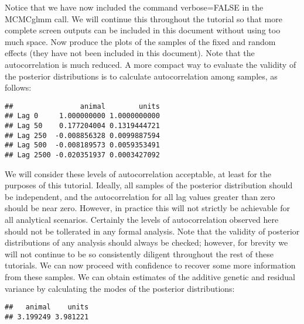 \documentclass[12pt,]{book}
\newenvironment{Shaded}{\begin{snugshade}}{\end{snugshade}}
\newcommand{\FloatTok}[1]{\textcolor[rgb]{0.00,0.00,0.81}{#1}}
\newcommand{\KeywordTok}[1]{\textcolor[rgb]{0.13,0.29,0.53}{\textbf{#1}}}
\newcommand{\NormalTok}[1]{#1}
\newcommand{\OperatorTok}[1]{\textcolor[rgb]{0.81,0.36,0.00}{\textbf{#1}}}
\begin{document}
Notice that we have now included the command verbose=FALSE in the MCMCglmm call. We will continue this throughout the tutorial so that more complete screen outputs can be included in this document without using too much space. Now produce the plots of the samples of the fixed and random effects (they have not been included in this document). Note that the autocorrelation is much reduced. A more compact way to evaluate the validity of the posterior distributions is to calculate autocorrelation among samples, as follows:

\begin{Shaded}
\end{Shaded}

\begin{verbatim}
##                animal        units
## Lag 0     1.000000000 1.0000000000
## Lag 50    0.177204004 0.1319444721
## Lag 250  -0.008856328 0.0099887594
## Lag 500  -0.008189573 0.0059353491
## Lag 2500 -0.020351937 0.0003427092
\end{verbatim}

We will consider these levels of autocorrelation acceptable, at least for the purposes of this tutorial. Ideally, all samples of the posterior distribution should be independent, and the autocorrelation for all lag values greater than zero should be near zero. However, in practice this will not strictly be achievable for all analytical scenarios. Certainly the levels of autocorrelation observed here should not be tollerated in any formal analysis. Note that the validity of posterior distributions of any analysis should always be checked; however, for brevity we will not continue to be so consistently diligent throughout the rest of these tutorials. We can now proceed with confidence to recover some more information from these samples. We can obtain estimates of the additive genetic and residual variance by calculating the modes of the posterior distributions:

\begin{Shaded}
\end{Shaded}

\begin{verbatim}
##   animal    units 
## 3.199249 3.981221
\end{verbatim}
\end{document}
